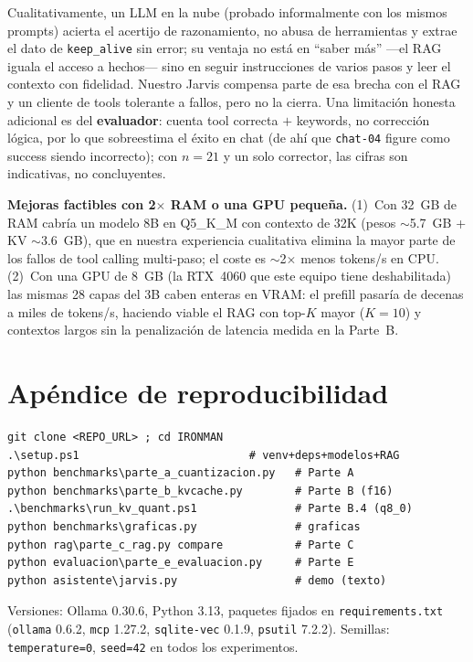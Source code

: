 \documentclass[conference]{IEEEtran}
\begin{document}
Cualitativamente, un LLM en la nube (probado informalmente con los mismos
prompts) acierta el acertijo de razonamiento, no abusa de herramientas y extrae
el dato de \texttt{keep\_alive} sin error; su ventaja no está en ``saber más''
---el RAG iguala el acceso a hechos--- sino en seguir instrucciones de varios
pasos y leer el contexto con fidelidad. Nuestro Jarvis compensa parte de esa
brecha con el RAG y un cliente de tools tolerante a fallos, pero no la cierra.
Una limitación honesta adicional es del \textbf{evaluador}: cuenta tool correcta
$+$ keywords, no corrección lógica, por lo que sobreestima el éxito en chat (de
ahí que \texttt{chat-04} figure como success siendo incorrecto); con $n{=}21$ y
un solo corrector, las cifras son indicativas, no concluyentes.

\textbf{Mejoras factibles con 2$\times$ RAM o una GPU pequeña.} (1)~Con 32~GB de
RAM cabría un modelo 8B en Q5\_K\_M con contexto de 32K (pesos $\sim$5.7~GB +
KV $\sim$3.6~GB), que en nuestra experiencia cualitativa elimina la mayor parte
de los fallos de tool calling multi-paso; el coste es $\sim$2$\times$ menos
tokens/s en CPU. (2)~Con una GPU de 8~GB (la RTX~4060 que este equipo tiene
deshabilitada) las mismas 28 capas del 3B caben enteras en VRAM: el prefill
pasaría de decenas a miles de tokens/s, haciendo viable el RAG con top-$K$ mayor
($K{=}10$) y contextos largos sin la penalización de latencia medida en la
Parte~B.

\section{Apéndice de reproducibilidad}

{\footnotesize
\begin{verbatim}
git clone <REPO_URL> ; cd IRONMAN
.\setup.ps1                          # venv+deps+modelos+RAG
python benchmarks\parte_a_cuantizacion.py   # Parte A
python benchmarks\parte_b_kvcache.py        # Parte B (f16)
.\benchmarks\run_kv_quant.ps1               # Parte B.4 (q8_0)
python benchmarks\graficas.py               # graficas
python rag\parte_c_rag.py compare           # Parte C
python evaluacion\parte_e_evaluacion.py     # Parte E
python asistente\jarvis.py                  # demo (texto)
\end{verbatim}
}

Versiones: Ollama 0.30.6, Python 3.13, paquetes fijados en
\texttt{requirements.txt} (\texttt{ollama} 0.6.2, \texttt{mcp} 1.27.2,
\texttt{sqlite-vec} 0.1.9, \texttt{psutil} 7.2.2). Semillas:
\texttt{temperature=0}, \texttt{seed=42} en todos los experimentos.
\end{document}
